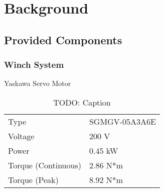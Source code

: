 \chapter{Background}
\label{background}


\section{Provided Components}
\subsection{Winch System}

Yaskawa Servo Motor

\begin{table}[h!]
	\centering
	\caption{TODO: Caption}
	\begin{tabular}{|l|l|}
	\hline
	\rowcolor{lightgray}
	\multicolumn{2}{|c|}{Yaskawa AC Servo Motor}        \\ \hline
	Type                & SGMGV-05A3A6E                 \\ \hline
	Voltage             & 200 V                         \\ \hline
	Power               & 0.45 kW                       \\ \hline
	Torque (Continuous) & 2.86 N*m                      \\ \hline
	Torque (Peak)       & 8.92 N*m                      \\ \hline
	\end{tabular}
\end{table}